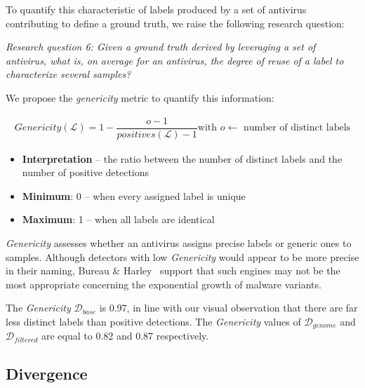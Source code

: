 To quantify this characteristic of labels produced by a set of antivirus contributing to define a ground truth, we raise the following research question:

\begin{mdframed}[roundcorner=10pt,nobreak]
	{\em Research question 6: Given a ground truth derived by leveraging a set of antivirus, what is, on average for an antivirus, the degree of reuse of a label to characterize several samples?}
\end{mdframed}

We propose the \emph{genericity} metric to quantify this information:

\begin{mdframed}[hidealllines=true,nobreak=true]
\begin{gather*}
	Genericity(\mathcal{L}) = 1 - \dfrac{o - 1}{positives(\mathcal{L}) - 1} \text{with $o \leftarrow$ number of distinct labels}
\end{gather*}

\begin{itemize}
	\item{\textbf{Interpretation}} -- the ratio between the number of distinct labels and the number of positive detections
	\item{\textbf{Minimum}}: 0 -- when every assigned label is unique
	\item{\textbf{Maximum}}: 1 -- when all labels are identical
\end{itemize}
\end{mdframed}

\emph{Genericity} assesses whether an antivirus assigns precise labels or generic ones to samples.
Although detectors with low \emph{Genericity} would appear to be more precise in their naming, Bureau \& Harley~\cite{bureau_dose_2008} support that such engines may not be the most appropriate concerning the exponential growth of malware variants.

The \emph{Genericity} $\mathcal{D}_{base}$ is 0.97, in line with our visual observation that there are far less distinct labels than positive detections.
The \emph{Genericity} values of $\mathcal{D}_{genome}$ and $\mathcal{D}_{filtered}$ are equal to 0.82 and 0.87 respectively.
\subsection{Divergence}

